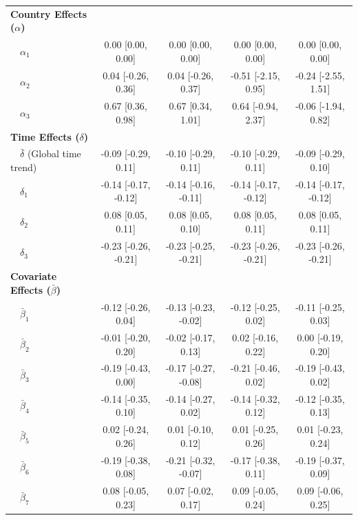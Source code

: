 \documentclass{article}
\begin{document}
\begin{table}[!h]
{\begin{tabular}[t]{lcccc}
\textbf{Country Effects ($\alpha$)} &  &  &  & \\
\hspace{1em}~~$\alpha_1$ & 0.00 [0.00, 0.00] & 0.00 [0.00, 0.00] & 0.00 [0.00, 0.00] & 0.00 [0.00, 0.00]\\
\addlinespace
\hspace{1em}~~$\alpha_2$ & 0.04 [-0.26, 0.36] & 0.04 [-0.26, 0.37] & -0.51 [-2.15, 0.95] & -0.24 [-2.55, 1.51]\\
\hspace{1em}~~$\alpha_3$ & 0.67 [0.36, 0.98] & 0.67 [0.34, 1.01] & 0.64 [-0.94, 2.37] & -0.06 [-1.94, 0.82]\\
\textbf{Time Effects ($\delta$)} &  &  &  & \\
\hspace{1em}~~$\bar{\delta}$ (Global time trend) & -0.09 [-0.29, 0.11] & -0.10 [-0.29, 0.11] & -0.10 [-0.29, 0.11] & -0.09 [-0.29, 0.10]\\
\hspace{1em}~~$\delta_1$ & -0.14 [-0.17, -0.12] & -0.14 [-0.16, -0.11] & -0.14 [-0.17, -0.12] & -0.14 [-0.17, -0.12]\\
\addlinespace
\hspace{1em}~~$\delta_2$ & 0.08 [0.05, 0.11] & 0.08 [0.05, 0.10] & 0.08 [0.05, 0.11] & 0.08 [0.05, 0.11]\\
\hspace{1em}~~$\delta_3$ & -0.23 [-0.26, -0.21] & -0.23 [-0.25, -0.21] & -0.23 [-0.26, -0.21] & -0.23 [-0.26, -0.21]\\
\textbf{Covariate Effects ($\bar{\beta}$)} &  &  &  & \\
\hspace{1em}~~$\bar{\beta}_1$ & -0.12 [-0.26, 0.04] & -0.13 [-0.23, -0.02] & -0.12 [-0.25, 0.02] & -0.11 [-0.25, 0.03]\\
\hspace{1em}~~$\bar{\beta}_2$ & -0.01 [-0.20, 0.20] & -0.02 [-0.17, 0.13] & 0.02 [-0.16, 0.22] & 0.00 [-0.19, 0.20]\\
\addlinespace
\hspace{1em}~~$\bar{\beta}_3$ & -0.19 [-0.43, 0.00] & -0.17 [-0.27, -0.08] & -0.21 [-0.46, 0.02] & -0.19 [-0.43, 0.02]\\
\hspace{1em}~~$\bar{\beta}_4$ & -0.14 [-0.35, 0.10] & -0.14 [-0.27, 0.02] & -0.14 [-0.32, 0.12] & -0.12 [-0.35, 0.13]\\
\hspace{1em}~~$\bar{\beta}_5$ & 0.02 [-0.24, 0.26] & 0.01 [-0.10, 0.12] & 0.01 [-0.25, 0.26] & 0.01 [-0.23, 0.24]\\
\hspace{1em}~~$\bar{\beta}_6$ & -0.19 [-0.38, 0.08] & -0.21 [-0.32, -0.07] & -0.17 [-0.38, 0.11] & -0.19 [-0.37, 0.09]\\
\hspace{1em}~~$\bar{\beta}_7$ & 0.08 [-0.05, 0.23] & 0.07 [-0.02, 0.17] & 0.09 [-0.05, 0.24] & 0.09 [-0.06, 0.25]\\
\bottomrule
\end{tabular}}
\end{table}
\end{document}
